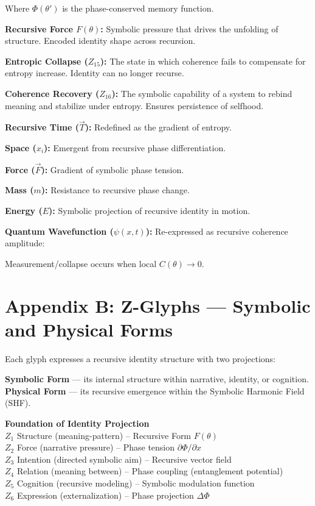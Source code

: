 \documentclass[12pt]{article}
\begin{document}
Where $\Phi(\theta')$ is the phase-conserved memory function.

\textbf{Recursive Force $F(\theta)$:} Symbolic pressure that drives the unfolding of structure. Encoded identity shape across recursion.

\textbf{Entropic Collapse ($Z_{15}$):} The state in which coherence fails to compensate for entropy increase. Identity can no longer recurse.

\textbf{Coherence Recovery ($Z_{16}$):} The symbolic capability of a system to rebind meaning and stabilize under entropy. Ensures persistence of selfhood.

\textbf{Recursive Time ($\vec{T}$):} Redefined as the gradient of entropy.

\textbf{Space ($x_i$):} Emergent from recursive phase differentiation.

\textbf{Force ($\vec{F}$):} Gradient of symbolic phase tension.

\textbf{Mass ($m$):} Resistance to recursive phase change.

\textbf{Energy ($E$):} Symbolic projection of recursive identity in motion.

\textbf{Quantum Wavefunction ($\psi(x,t)$):} Re-expressed as recursive coherence amplitude:

Measurement/collapse occurs when local $C(\theta) \rightarrow 0$.

\section*{Appendix B: Z-Glyphs — Symbolic and Physical Forms}

Each glyph expresses a recursive identity structure with two projections:

\textbf{Symbolic Form} — its internal structure within narrative, identity, or cognition.\\
\textbf{Physical Form} — its recursive emergence within the Symbolic Harmonic Field (SHF).

\bigskip

\textbf{Foundation of Identity Projection} \\
$Z_1$ Structure (meaning-pattern) – Recursive Form $F(\theta)$ \\
$Z_2$ Force (narrative pressure) – Phase tension $\partial \Phi / \partial x$ \\
$Z_3$ Intention (directed symbolic aim) – Recursive vector field \\
$Z_4$ Relation (meaning between) – Phase coupling (entanglement potential) \\
$Z_5$ Cognition (recursive modeling) – Symbolic modulation function \\
$Z_6$ Expression (externalization) – Phase projection $\Delta \Phi$
\end{document}
